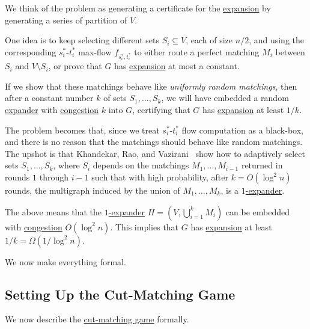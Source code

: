 \begin{intuition}
	We think of the problem as generating a certificate for the \hyperref[def:expansion]{expansion} by generating a series of partition of \(V\).
\end{intuition}

One idea is to keep selecting different sets \(S_i \subseteq V\), each of size \(n / 2\), and using the corresponding \(s^{\ast} _i\)-\(t^{\ast} _i\) max-flow \(f_{s^{\ast}_i , t^{\ast}_i }\) to either route a perfect matching \(M_i\) between \(S_i\) and \(V\setminus S_i\), or prove that \(G\) has \hyperref[def:expansion]{expansion} at most a constant.

\begin{intuition}
	If we show that these matchings behave like \emph{uniformly random matchings}, then after a constant number \(k\) of sets \(S_1, \dots , S_k\), we will have embedded a random \hyperref[def:expander]{expander} with \hyperref[def:congestion]{congestion} \(k\) into \(G\), certifying that \(G\) has \hyperref[def:expansion]{expansion} at least \(1 / k\).
\end{intuition}

The problem becomes that, since we treat \(s^{\ast}_i\)-\(t^{\ast} _i\) flow computation as a black-box, and there is no reason that the matchings should behave like random matchings. The upshot is that Khandekar, Rao, and Vazirani~\cite{khandekar2009graph} show how to adaptively select sets \(S_1, \dots , S_k\), where \(S_i\) depends on the matchings \(M_1, \dots , M_{i-1}\) returned in rounds \(1\) through \(i-1\) such that with high probability, after \(k = O(\log ^2 n)\) rounds, the multigraph induced by the union of \(M_1, \dots , M_k\), is a \hyperref[def:expander]{\(1\)-expander}.

\begin{remark}
	The above means that the \hyperref[def:expander]{\(1\)-expander} \(H = (V, \bigcup_{i=1}^{k} M_i)\) can be embedded with \hyperref[def:congestion]{congestion} \(O(\log ^2 n)\). This implies that \(G\) has \hyperref[def:expansion]{expansion} at least \(1 / k = \Omega (1 / \log ^2 n)\).
\end{remark}

We now make everything formal.

\subsection{Setting Up the Cut-Matching Game}
We now describe the \hyperref[def:cut-matching-game]{cut-matching game} formally.

